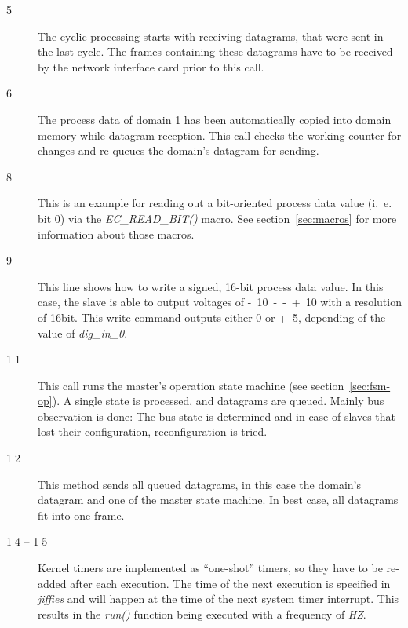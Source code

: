 \documentclass[a4paper,12pt,BCOR6mm,bibtotoc,idxtotoc]{scrbook}
\newcommand{\linenum}[1]{\normalfont\textcircled{\tiny #1}}
\begin{document}
\begin{description}

\item[\linenum{5}] The cyclic processing starts with receiving datagrams, that
were sent in the last cycle. The frames containing these datagrams have to be
received by the network interface card prior to this call.

\item[\linenum{6}] The process data of domain 1 has been automatically copied
into domain memory while datagram reception. This call checks the working
counter for changes and re-queues the domain's datagram for sending.

\item[\linenum{8}] This is an example for reading out a bit-oriented process
data value (i.~e. bit 0) via the \textit{EC\_READ\_BIT()} macro. See
section~\ref{sec:macros} for more information about those macros.

\item[\linenum{9}] This line shows how to write a signed, 16-bit process data
value. In this case, the slave is able to output voltages of
\unit{-10--+10}{\volt} with a resolution of \unit{16}{bit}.  This write command
outputs either \unit{0}{\volt} or \unit{+5}{\volt}, depending of the value of
\textit{dig\_in\_0}.

\item[\linenum{11}] This call runs the master's operation state machine (see
section~\ref{sec:fsm-op}). A single state is processed, and datagrams are
queued. Mainly bus observation is done: The bus state is determined and in case
of slaves that lost their configuration, reconfiguration is tried.

\item[\linenum{12}] This method sends all queued datagrams, in this case the
domain's datagram and one of the master state machine. In best case, all
datagrams fit into one frame.

\item[\linenum{14} -- \linenum{15}] Kernel timers are implemented as
``one-shot'' timers, so they have to be re-added after each execution. The time
of the next execution is specified in \textit{jiffies} and will happen at the
time of the next system timer interrupt. This results in the \textit{run()}
function being executed with a frequency of \textit{HZ}.

\end{description}

\end{document}
